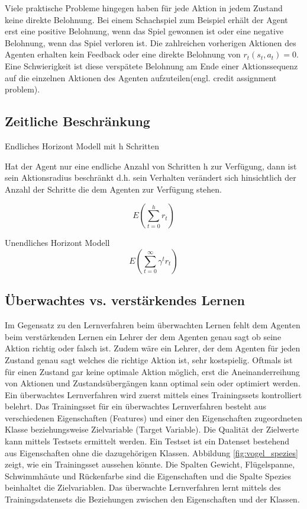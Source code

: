 Viele praktische Probleme hingegen haben für jede Aktion in jedem Zustand keine direkte Belohnung. Bei einem Schachspiel zum Beispiel erhält der Agent erst eine positive Belohnung, wenn das Spiel gewonnen ist oder eine negative Belohnung, wenn das Spiel verloren ist. Die zahlreichen vorherigen Aktionen des Agenten erhalten kein Feedback oder eine direkte Belohnung von $r_t(s_t, a_t) = 0$. Eine Schwierigkeit ist diese verspätete Belohnung am Ende einer Aktionssequenz auf die einzelnen Aktionen des Agenten aufzuteilen(engl. credit assignment problem).

\cite[290]{Ertel}   

\subsection{Zeitliche Beschränkung}
Endliches Horizont Modell mit h Schritten

Hat der Agent nur eine endliche Anzahl von Schritten h zur Verfügung, dann ist sein Aktionsradius beschränkt d.h. sein Verhalten verändert sich hinsichtlich der Anzahl der Schritte die dem Agenten zur Verfügung stehen. 

\begin{equation}
E(\sum_{t=0}^{h} r_t)
\end{equation}


Unendliches Horizont Modell
\begin{equation}
E(\sum_{t=0}^{\infty} \gamma^t r_t)
\end{equation}

\subsection{Überwachtes \acs{vs.} verstärkendes Lernen}
Im Gegensatz zu den Lernverfahren beim überwachten Lernen fehlt dem Agenten beim verstärkenden Lernen ein Lehrer der dem Agenten genau sagt ob seine Aktion richtig oder falsch ist. Zudem wäre ein Lehrer, der dem Agenten für jeden Zustand genau sagt welches die richtige Aktion ist, sehr kostspielig. Oftmals ist für einen Zustand gar keine optimale Aktion möglich, erst die Aneinanderreihung von Aktionen und Zustandsübergängen kann optimal sein oder optimiert werden\cite[\acs{vgl.} 397]{Alpaydin}. \\

Ein überwachtes Lernverfahren wird zuerst mittels eines Trainingssets kontrolliert belehrt. Das Trainingsset für ein überwachtes Lernverfahren besteht aus verschiedenen Eigenschaften (Features) und einer den Eigenschaften zugeordneten Klasse beziehungsweise Zielvariable (Target Variable). Die Qualität der Zielwerte kann mittels Testsets ermittelt werden. Ein Testset ist ein Datenset bestehend aus Eigenschaften ohne die dazugehörigen Klassen. Abbildung \ref{fig:vogel_spezies} zeigt, wie ein Trainingsset aussehen könnte\cite[8]{Harrington}. Die Spalten Gewicht, Flügelspanne, Schwimmhäute und Rückenfarbe sind die Eigenschaften und die Spalte Spezies beinhaltet die Zielvariablen. Das überwachte Lernverfahren lernt mittels des Trainingsdatensets die Beziehungen zwischen den Eigenschaften und der Klassen. \\

